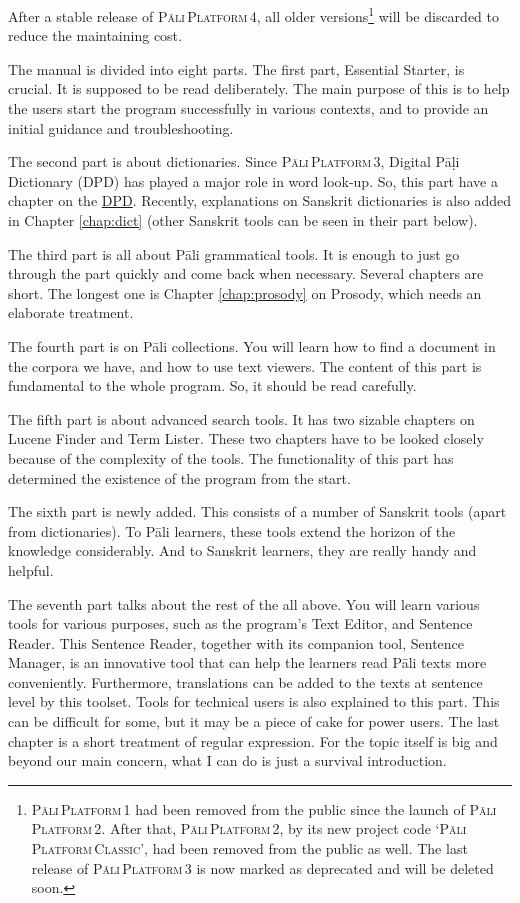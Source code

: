 After a stable release of \textsc{Pāli\,Platform\,4}, all older versions\footnote{\textsc{Pāli\,Platform\,1} had been removed from the public since the launch of \textsc{Pāli\,Platform\,2}. After that, \textsc{Pāli\,Platform\,2}, by its new project code `\textsc{Pāli\,Platform\,Classic}', had been removed from the public as well. The last release of \textsc{Pāli\,Platform\,3} is now marked as deprecated and will be deleted soon.} will be discarded to reduce the maintaining cost.

The manual is divided into eight parts. The first part, Essential Starter, is crucial. It is supposed to be read deliberately. The main purpose of this is to help the users start the program successfully in various contexts, and to provide an initial guidance and troubleshooting.

The second part is about dictionaries. Since \textsc{Pāli\,Platform\,3}, Digital Pāḷi Dictionary (DPD) has played a major role in word look-up. So, this part have a chapter on the \hyperref[chap:dpd]{DPD}. Recently, explanations on Sanskrit dictionaries is also added in Chapter \ref{chap:dict} (other Sanskrit tools can be seen in their part below).

The third part is all about Pāli grammatical tools. It is enough to just go through the part quickly and come back when necessary. Several chapters are short. The longest one is Chapter \ref{chap:prosody} on Prosody, which needs an elaborate treatment.

The fourth part is on Pāli collections. You will learn how to find a document in the corpora we have, and how to use text viewers. The content of this part is fundamental to the whole program. So, it should be read carefully.

The fifth part is about advanced search tools. It has two sizable chapters on Lucene Finder and Term Lister. These two chapters have to be looked closely because of the complexity of the tools. The functionality of this part has determined the existence of the program from the start.

The sixth part is newly added. This consists of a number of Sanskrit tools (apart from dictionaries). To Pāli learners, these tools extend the horizon of the knowledge considerably. And to Sanskrit learners, they are really handy and helpful.

The seventh part talks about the rest of the all above. You will learn various tools for various purposes, such as the program's Text Editor, and Sentence Reader. This Sentence Reader, together with its companion tool, Sentence Manager, is an innovative tool that can help the learners read Pāli texts more conveniently. Furthermore, translations can be added to the texts at sentence level by this toolset. Tools for technical users is also explained to this part. This can be difficult for some, but it may be a piece of cake for power users. The last chapter is a short treatment of regular expression. For the topic itself is big and beyond our main concern, what I can do is just a survival introduction.

